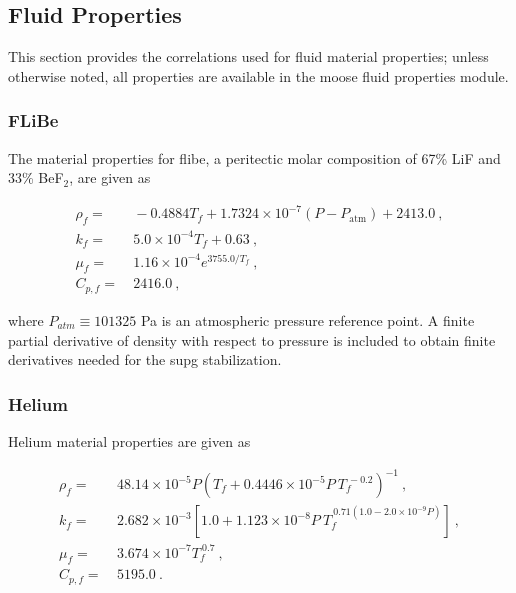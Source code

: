 \begin{appendices}
\subsection*{Fluid Properties}

This section provides the correlations used for fluid material properties; unless otherwise noted, all properties are available in the \gls{moose} fluid properties module.

\subsubsection*{FLiBe}
The material properties for \gls{flibe}, a peritectic molar composition of 67\% LiF and 33\% BeF$_2$, are given as \cite{richard,romatoski}

\begin{subequations}
\label{eq:flibe}
\begin{align}
\rho_f=&\ -0.4884T_f+1.7324\times10^{-7}(P-P_\text{atm})+2413.0\ ,\\
k_f=&\ 5.0\times10^{-4}T_f+0.63\ ,\\
\mu_f=&\ 1.16\times10^{-4}e^{3755.0/T_f}\ ,\\
C_{p,f}=&\ 2416.0\ ,
\end{align}
\end{subequations}

\noindent where \(P_{atm}\equiv101325\) \si{\pascal} is an atmospheric pressure reference point. A finite partial derivative of density with respect to pressure is included to obtain finite derivatives needed for the \gls{supg} stabilization. 

\subsubsection*{Helium}
Helium material properties are given as \cite{petersen}

\begin{subequations}
\label{eq:helium}
\begin{align}
\rho_f=&\ 48.14\times10^{-5}P\left(T_f+0.4446\times10^{-5}P\ T_f^{\ -0.2}\right)^{-1}\ ,\\
k_f=&\ 2.682\times10^{-3}\left\lbrack1.0 + 1.123\times10^{-8}P\ T_f^{\ 0.71(1.0 - 2.0\times10^{-9}P)}\right\rbrack\ ,\\
\mu_f=&\ 3.674\times10^{-7}T_f^{\ 0.7}\ ,\\
C_{p,f}=&\ 5195.0\ .
\end{align}
\end{subequations}


\end{appendices}

